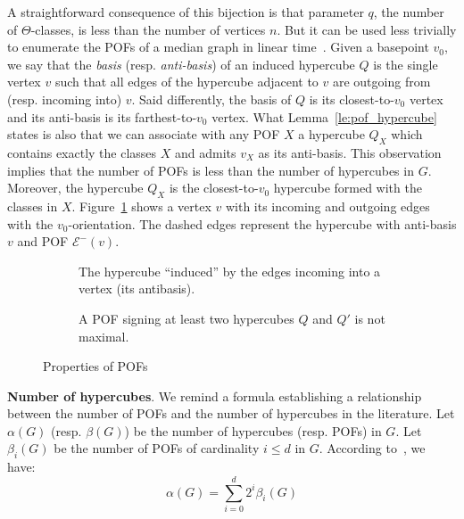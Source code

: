 \documentclass[a4paper,UKenglish,numberwithinsect,cleveref, autoref]{lipics-v2021}
\begin{document}
A straightforward consequence of this bijection is that parameter $q$, the number of $\Theta$-classes, is less than the number of vertices $n$. But it can be used less trivially to enumerate the POFs of a median graph in linear time~\cite{BaQuSaMa02,Ko09}. Given a basepoint $v_0$, we say that the \textit{basis} (resp. \textit{anti-basis}) of an induced hypercube $Q$ is the single vertex $v$ such that all edges of the hypercube adjacent to $v$ are outgoing from (resp. incoming into) $v$. Said differently, the basis of $Q$ is its closest-to-$v_0$ vertex and its anti-basis is its farthest-to-$v_0$ vertex. What Lemma~\ref{le:pof_hypercube} states is also that we can associate with any POF $X$ a hypercube $Q_X$ which contains exactly the classes $X$ and admits $v_X$ as its anti-basis. This observation implies that the number of POFs is less than the number of hypercubes in $G$. Moreover, the hypercube $Q_X$ is the closest-to-$v_0$ hypercube formed with the classes in $X$. Figure~\ref{subfig:ingoing_edges} shows a vertex $v$ with its incoming and outgoing edges with the $v_0$-orientation. The dashed edges represent the hypercube with anti-basis $v$ and POF $\mathcal{E}^-(v)$.

\begin{figure}[h]
\begin{subfigure}[b]{0.49\columnwidth}
\centering
\scalebox{0.8}{}
\caption{The hypercube ``induced'' by the edges incoming into a vertex (its antibasis).}
\label{subfig:ingoing_edges}
\end{subfigure}
\begin{subfigure}[b]{0.49\columnwidth}
\centering
\scalebox{0.8}{}
\caption{A POF signing at least two hypercubes $Q$ and $Q'$ is not maximal.}
\label{subfig:maximal_pof}
\end{subfigure}
\caption{Properties of POFs}
\label{fig:properties_pofs}
\end{figure} 

\textbf{Number of hypercubes}. We remind a formula establishing a relationship between the number of POFs and the number of hypercubes in the literature. Let $\alpha(G)$ (resp. $\beta(G)$) be the number of hypercubes (resp. POFs) in $G$. Let $\beta_i(G)$ be the number of POFs of cardinality $i \le d$ in $G$. According to~\cite{BaQuSaMa02,Ko09}, we have:
\begin{equation}
\alpha(G) = \sum_{i=0}^d 2^i\beta_i(G)
\label{eq:number_hypercubes}
\end{equation}
\end{document}
